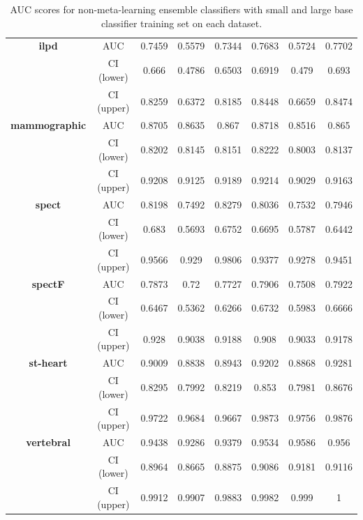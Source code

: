 \documentclass{bioinfo}
\begin{document}
\begin{table}[t]
\begin{tabular*}{16.5cm}{@{\extracolsep{\fill} } |c||c|c|c|c|c|c|c|}
    \textbf{ilpd} & AUC & 0.7459 & 0.5579 & 0.7344 & 0.7683 & 0.5724 & 0.7702\\
     & CI (lower) & 0.666 & 0.4786 & 0.6503 & 0.6919 & 0.479 & 0.693\\
     & CI (upper) & 0.8259 & 0.6372 & 0.8185 & 0.8448 & 0.6659 & 0.8474\\ \hline

    \textbf{mammographic} & AUC & 0.8705 & 0.8635 & 0.867 & 0.8718 & 0.8516 & 0.865\\
     & CI (lower) & 0.8202 & 0.8145 & 0.8151 & 0.8222 & 0.8003 & 0.8137\\
     & CI (upper) & 0.9208 & 0.9125 & 0.9189 & 0.9214 & 0.9029 & 0.9163\\ \hline

    \textbf{spect} & AUC & 0.8198 & 0.7492 & 0.8279 & 0.8036 & 0.7532 & 0.7946\\
     & CI (lower) & 0.683 & 0.5693 & 0.6752 & 0.6695 & 0.5787 & 0.6442\\
     & CI (upper) & 0.9566 & 0.929 & 0.9806 & 0.9377 & 0.9278 & 0.9451\\ \hline

    \textbf{spectF} & AUC & 0.7873 & 0.72 & 0.7727 & 0.7906 & 0.7508 & 0.7922\\
     & CI (lower) & 0.6467 & 0.5362 & 0.6266 & 0.6732 & 0.5983 & 0.6666\\
     & CI (upper) & 0.928 & 0.9038 & 0.9188 & 0.908 & 0.9033 & 0.9178\\ \hline

    \textbf{st-heart} & AUC & 0.9009 & 0.8838 & 0.8943 & 0.9202 & 0.8868 & 0.9281\\
     & CI (lower) & 0.8295 & 0.7992 & 0.8219 & 0.853 & 0.7981 & 0.8676\\
     & CI (upper) & 0.9722 & 0.9684 & 0.9667 & 0.9873 & 0.9756 & 0.9876\\ \hline

    \textbf{vertebral} & AUC & 0.9438 & 0.9286 & 0.9379 & 0.9534 & 0.9586 & 0.956\\
     & CI (lower) & 0.8964 & 0.8665 & 0.8875 & 0.9086 & 0.9181 & 0.9116\\
     & CI (upper) & 0.9912 & 0.9907 & 0.9883 & 0.9982 & 0.999 & 1\\ \hline
\end{tabular*}
\caption{AUC scores for non-meta-learning ensemble classifiers with small and large base classifier training set on each dataset.}
\label{fig:06}
\end{table}
\end{document}
